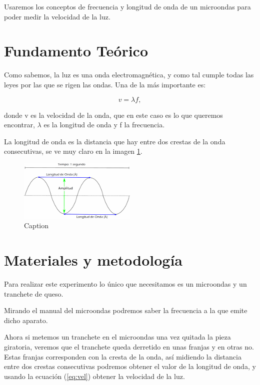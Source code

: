 \documentclass{article}
\begin{document}
Usaremos los conceptos de frecuencia y longitud de onda de un microondas para poder medir la velocidad de la luz.


\section{Fundamento Teórico}

Como sabemos, la luz es una onda electromagnética, y como tal cumple todas las leyes por las que se rigen las ondas. Una de la más importante es:

\begin{equation}\label{eq:vel}
    v = \lambda f,
\end{equation}

donde v es la velocidad de la onda, que en este caso es lo que queremos encontrar, $\lambda$ es la longitud de onda y f la frecuencia.\cite{Laguna2010}

La longitud de onda es la distancia que hay entre dos crestas de la onda consecutivas, se ve muy claro en la imagen \ref{fig:onda}. \cite{Marion1989}

\begin{figure}[H]
    \centering
    \includegraphics[width = 0.5\textwidth]{onda}
    \caption{Caption}
    \label{fig:onda}
\end{figure}

\section{Materiales y metodología}
Para realizar este experimento lo único que necesitamos es un microondas y un tranchete de queso.

Mirando el manual del microondas podremos saber la frecuencia a la que emite dicho aparato.

Ahora si metemos un tranchete en el microondas una vez quitada la pieza giratoria, veremos que el tranchete queda derretido en unas franjas y en otras no. Estas franjas corresponden con la cresta de la onda, así midiendo la distancia entre dos crestas consecutivas podremos obtener el valor de la longitud de onda, y usando la ecuación (\ref{eq:vel}) obtener la velocidad de la luz.\cite{Laguna2010}
\end{document}
